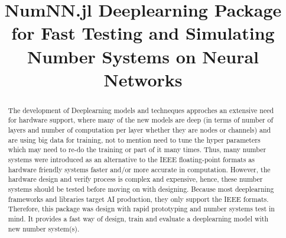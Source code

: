 \documentclass[onecolumn,draftcls,12pt,conference]{IEEEtran}
\title{NumNN.jl Deeplearning Package for Fast Testing and Simulating Number Systems on Neural Networks}
\author{\IEEEauthorblockN{Mohammad~Hizzani} \IEEEauthorblockA{University of Lisbon\\
		Email: \href{mailto:moh.hizzani@gmail.com}{moh.hizzani@gmail.com}}
}
\begin{document}
	\maketitle

	\begin{abstract}
		The development of Deeplearning models and techneques approches an extensive need for hardware support, where many of the new models are deep (in terms of number of layers and number of computation per layer whether they are nodes or channels) and are using big data for training, not to mention need to tune the hyper parameters which may need to re-do the training or part of it many times. Thus, many number systems were introduced as an alternative to the IEEE floating-point formats as hardware friendly systems faster and/or more accurate in computation. However, the hardware design and verify process is complex and expensive, hence, these number systems should be tested before moving on with designing. Because most deeplearning frameworks and libraries target AI production, they only support the IEEE formats. Therefore, this package was design with rapid prototyping and number systems test in mind. It provides a fast way of design, train and evaluate a deeplearning model with new number system(s).
	\end{abstract}

	
	
	
	
	
	
\end{document}
